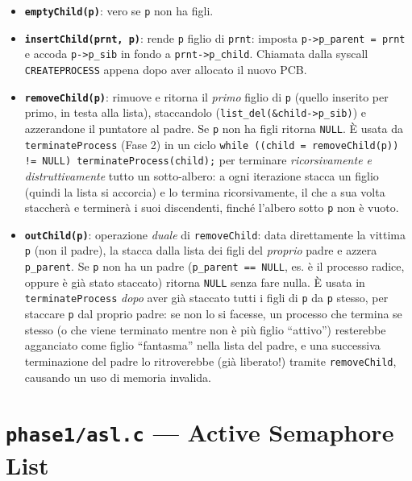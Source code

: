 \documentclass[11pt,a4paper]{article}
\newcommand{\code}[1]{\texttt{#1}}
\newcommand{\func}[1]{\textbf{\texttt{#1}}}
\begin{document}
\begin{itemize}
\item \func{emptyChild(p)}: vero se \code{p} non ha figli.
\item \func{insertChild(prnt, p)}: rende \code{p} figlio di \code{prnt}:
  imposta \code{p->p\_parent = prnt} e accoda \code{p->p\_sib} in fondo a
  \code{prnt->p\_child}. Chiamata dalla syscall \code{CREATEPROCESS} appena
  dopo aver allocato il nuovo PCB.
\item \func{removeChild(p)}: rimuove e ritorna il \emph{primo} figlio di
  \code{p} (quello inserito per primo, in testa alla lista), staccandolo
  (\code{list\_del(\&child->p\_sib)}) e azzerandone il puntatore al padre.
  Se \code{p} non ha figli ritorna \code{NULL}. È usata da
  \code{terminateProcess} (Fase 2) in un ciclo
  \code{while ((child = removeChild(p)) != NULL) terminateProcess(child);}
  per terminare \emph{ricorsivamente e distruttivamente} tutto un
  sotto-albero: a ogni iterazione stacca un figlio (quindi la lista si
  accorcia) e lo termina ricorsivamente, il che a sua volta staccherà e
  terminerà i suoi discendenti, finché l'albero sotto \code{p} non è vuoto.
\item \func{outChild(p)}: operazione \emph{duale} di \code{removeChild}:
  data direttamente la vittima \code{p} (non il padre), la stacca dalla
  lista dei figli del \emph{proprio} padre e azzera \code{p\_parent}. Se
  \code{p} non ha un padre (\code{p\_parent == NULL}, es. è il processo
  radice, oppure è già stato staccato) ritorna \code{NULL} senza fare nulla.
  È usata in \code{terminateProcess} \emph{dopo} aver già staccato tutti i
  figli di \code{p} da \code{p} stesso, per staccare \code{p} dal proprio
  padre: se non lo si facesse, un processo che termina se stesso (o che
  viene terminato mentre non è più figlio ``attivo'') resterebbe agganciato
  come figlio ``fantasma'' nella lista del padre, e una successiva
  terminazione del padre lo ritroverebbe (già liberato!) tramite
  \code{removeChild}, causando un uso di memoria invalida.
\end{itemize}

\section{\code{phase1/asl.c} --- Active Semaphore List}
\end{document}
